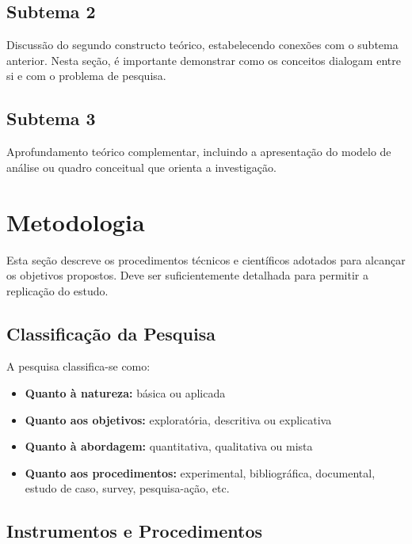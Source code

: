 \documentclass[preprint,12pt,review]{elsarticle}
\begin{document}
\subsection{Subtema 2}

Discussão do segundo constructo teórico, estabelecendo conexões com o subtema
anterior. Nesta seção, é importante demonstrar como os conceitos dialogam
entre si e com o problema de pesquisa.

\subsection{Subtema 3}

Aprofundamento teórico complementar, incluindo a apresentação do modelo de
análise ou quadro conceitual que orienta a investigação.

\section{Metodologia}

Esta seção descreve os procedimentos técnicos e científicos adotados para
alcançar os objetivos propostos. Deve ser suficientemente detalhada para
permitir a replicação do estudo.

\subsection{Classificação da Pesquisa}

A pesquisa classifica-se como:
\begin{itemize}
  \item \textbf{Quanto à natureza:} básica ou aplicada
  \item \textbf{Quanto aos objetivos:} exploratória, descritiva ou explicativa
  \item \textbf{Quanto à abordagem:} quantitativa, qualitativa ou mista
  \item \textbf{Quanto aos procedimentos:} experimental, bibliográfica,
    documental, estudo de caso, survey, pesquisa-ação, etc.
\end{itemize}

\subsection{Instrumentos e Procedimentos}
\end{document}
